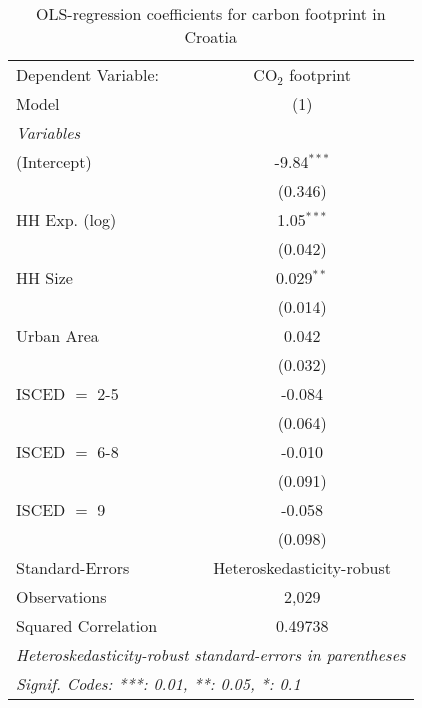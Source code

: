 
\begin{table}[htbp!]
   \centering
   \small
   \begin{adjustbox}{width = 1\textwidth, max height = 0.95\textheight, center}
      \begin{threeparttable}[b]
         \caption{\label{tab:OLS_2_HRV} OLS-regression coefficients for carbon footprint in Croatia}
         \begin{tabular}{lc}
            \tabularnewline \midrule \midrule
            Dependent Variable: & CO$_{2}$ footprint\\  
            Model               & (1)\\  
            \midrule
            \emph{Variables}\\
            (Intercept)         & -9.84$^{***}$\\   
                                & (0.346)\\   
            HH Exp. (log)       & 1.05$^{***}$\\   
                                & (0.042)\\   
            HH Size             & 0.029$^{**}$\\   
                                & (0.014)\\   
            Urban Area          & 0.042\\   
                                & (0.032)\\   
            ISCED $=$ 2-5       & -0.084\\   
                                & (0.064)\\   
            ISCED $=$ 6-8       & -0.010\\   
                                & (0.091)\\   
            ISCED $=$ 9         & -0.058\\   
                                & (0.098)\\   
            \midrule 
            Standard-Errors     & Heteroskedasticity-robust \\   
            Observations        & 2,029\\  
            Squared Correlation & 0.49738\\  
            \midrule \midrule
            \multicolumn{2}{l}{\emph{Heteroskedasticity-robust standard-errors in parentheses}}\\
            \multicolumn{2}{l}{\emph{Signif. Codes: ***: 0.01, **: 0.05, *: 0.1}}\\
         \end{tabular}
         

\end{threeparttable}
\end{adjustbox}
\end{table}
